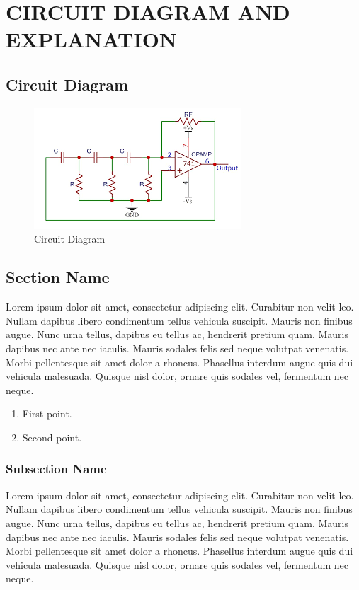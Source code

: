 \documentclass[12pt,a4paper]{report}
\begin{document}
\chapter{CIRCUIT DIAGRAM AND EXPLANATION}

\section{Circuit  Diagram}

\begin{figure}[H]
	\begin{center}
		\leavevmode
			\includegraphics[width=.6\textwidth]{circuit}
	\end{center}
		\caption{Circuit Diagram}
		\label{fig:Circuit Diagram}
\end{figure}

\section{Section Name}
Lorem ipsum dolor sit amet, consectetur adipiscing elit. Curabitur non velit leo. Nullam dapibus libero condimentum tellus vehicula suscipit. Mauris non finibus augue. Nunc urna tellus, dapibus eu tellus ac, hendrerit pretium quam. Mauris dapibus nec ante nec iaculis. Mauris sodales felis sed neque volutpat venenatis. Morbi pellentesque sit amet dolor a rhoncus. Phasellus interdum augue quis dui vehicula malesuada. Quisque nisl dolor, ornare quis sodales vel, fermentum nec neque. 

\begin{enumerate}
\item First point.
\item Second point.
\end{enumerate}

\subsection{Subsection Name}
Lorem ipsum dolor sit amet, consectetur adipiscing elit. Curabitur non velit leo. Nullam dapibus libero condimentum tellus vehicula suscipit. Mauris non finibus augue. Nunc urna tellus, dapibus eu tellus ac, hendrerit pretium quam. Mauris dapibus nec ante nec iaculis. Mauris sodales felis sed neque volutpat venenatis. Morbi pellentesque sit amet dolor a rhoncus. Phasellus interdum augue quis dui vehicula malesuada. Quisque nisl dolor, ornare quis sodales vel, fermentum nec neque. 
\end{document}
